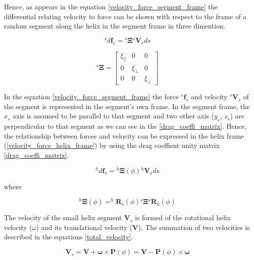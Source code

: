 \documentclass[12pt,a4paper,titlepage]{report}
\begin{document}
Hence, as appears in the equation \ref{velocity_force_segment_frame} the differential relating velocity to force can be shown with respect to the frame of 
a random segment along the helix in the segment frame in three dimention.   



\begin{equation}
 ^{s}d\bm{f}_s = {^{s}\bm{\Xi}}{^{s}\bm{V}_s}{ds}
\label{velocity_force_segment_frame}
\end{equation}


\begin{equation}
 ^{s}\bm\Xi = \begin{bmatrix}
       \xi_{\parallel}  & 0 		 & 0           \\[0.3em]
       0		 & \xi_{\perp}           & 0\\[0.3em]
       0           	& 0 		& \xi_{\perp}
     \end{bmatrix}
\label{drag_coeffi_matrix}
\end{equation}

In the equation \ref{velocity_force_segment_frame} the force $^{s}\bm{f}_s$ and velocity $^{s}\bm{V}_s$ of
the segment is represented in the segment\rq{}s own frame. 
In the segment frame, the $x_s$ axis is assumed to be parallel to that segment and two other axis 
($y_s$, $z_s$) are perpendicular to that segment as we can see in the \ref{drag_coeffi_matrix}.
Hence, the relationship between forces and velocity can be expressed in the helix 
frame (\ref{velocity_force_helix_frame}) by using the drag coeffient unity matrix \ref{drag_coeffi_matrix}.

\begin{equation}
 ^{h}d\bm{f}_s = {^{h}\bm{\Xi}}(\phi){^{h}\bm{V}_s}{ds}
\label{velocity_force_helix_frame}
\end{equation}

where


\begin{equation}
{^{h}\bm{\Xi}}(\phi) = ^{h}\bm{R}_s(\phi){^{s}\bm{\Xi}}{^{s}\bm{R}_h(\phi)}
\label{drag_coeff_matrix_rotated}
\end{equation}

The velocity of the small helix segment $\bm{V}_s$ is formed of the rotational helix velocity ($\omega$) 
and its translational velocity ($\bm{V}$). The summation of two velocities is described in the equations
\ref{total_velocity}.

\begin{equation}
\bm{V}_s = \bm{V} + \bm{\omega} \times {\bm{P}(\phi)} = \bm{V} - {\bm{P}(\phi)}\times{\bm{\omega}}
\label{total_velocity}
\end{equation}
\end{document}
